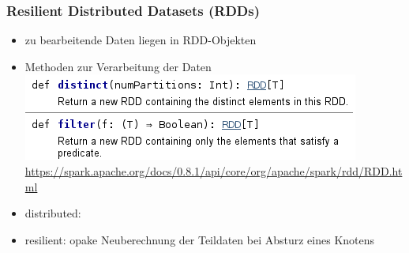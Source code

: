 \begin{frame}
    \frametitle{Resilient Distributed Datasets (RDDs)}
    \begin{itemize}
        \item zu bearbeitende Daten liegen in RDD-Objekten
        \item Methoden zur Verarbeitung der Daten
              \includegraphics[width=\linewidth]{rdd-disting-filter.png}\\
              \textcolor{gray}{\scriptsize{\url{
                 https://spark.apache.org/docs/0.8.1/api/core/org/apache/spark/rdd/RDD.html
              }}}
        \item distributed:
        \item resilient: opake Neuberechnung der Teildaten bei Absturz eines Knotens
    \end{itemize}
\end{frame}


%
%
%

